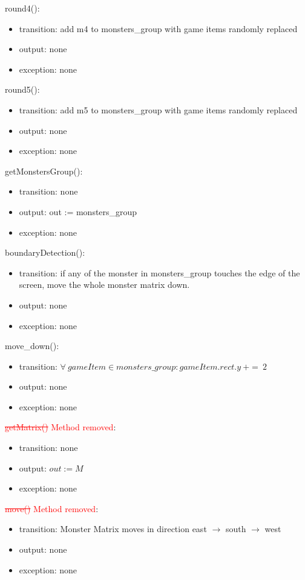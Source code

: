 \documentclass[12pt]{article}
\begin{document}
\noindent round4():
\begin{itemize}
\item transition: add m4 to monsters\_group with game items randomly replaced
\item output: none
\item exception: none
\end{itemize}

\noindent round5():
\begin{itemize}
\item transition: add m5 to monsters\_group with game items randomly replaced
\item output: none
\item exception: none
\end{itemize}

\noindent getMonstersGroup():
\begin{itemize}
\item transition: none
\item output: out := monsters\_group
\item exception: none
\end{itemize}

\noindent boundaryDetection():
\begin{itemize}
\item transition: if any of the monster in monsters\_group touches the edge
of the screen, move the whole monster matrix down.
\item output: none
\item exception: none
\end{itemize}

\noindent move\_down():
\begin{itemize}
\item transition: $\forall\ gameItem \in monsters\_group : gameItem.rect.y\ +=\ 2$
\item output: none
\item exception: none
\end{itemize}

\noindent \textcolor{red}{\st{\noindent getMatrix()}  Method removed}:
\begin{itemize}
\item transition: none
\item output: $out := M$
\item exception: none
\end{itemize}

\noindent \textcolor{red}{\st{move()} Method removed}:
\begin{itemize}
\item transition: Monster Matrix moves in direction east $\rightarrow$ south $\rightarrow$ west
\item output: none
\item exception: none
\end{itemize}
\end{document}
